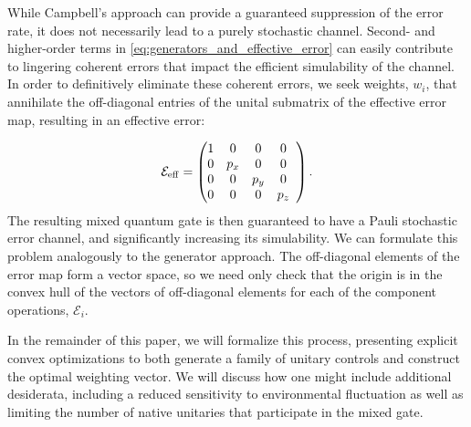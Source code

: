 \documentclass[aps,nofootinbib,pra,notitlepage,twocolumn]{revtex4-1}
\begin{document}
While Campbell's approach can provide a guaranteed suppression of the error rate, it does not necessarily lead to a purely stochastic channel. Second- and higher-order terms in \eqref{eq:generators_and_effective_error} can easily contribute to lingering coherent errors that impact the efficient simulability of the channel. In order to definitively eliminate these coherent errors, we seek weights, $w_i$, that annihilate the off-diagonal entries of the unital submatrix of the effective error map, resulting in an effective error:

\begin{equation}
	\mathcal{E}_{\rm{eff}} = 
	\left(\begin{array}{@{}ccccc@{}}
		1 & 0 & 0 & 0 \\ 
    	0 &  p_x & 0 & 0 \\
		0 & 0 &  p_y & 0\\
		0 & 0 & 0 &  p_z\\
	\end{array} 	
	\right).
\end{equation}
The resulting mixed quantum gate is then guaranteed to have a Pauli stochastic error channel, and significantly increasing its simulability. We can formulate this problem analogously to the generator approach. The off-diagonal elements of the error map form a vector space, so we need only check that the origin is in the convex hull of the vectors of off-diagonal elements for each of the component operations, $\mathcal{E}_i$. 

In the remainder of this paper, we will formalize this process, presenting explicit convex optimizations to both generate a family of unitary controls and construct the optimal weighting vector. We will discuss how one might include additional desiderata, including a reduced sensitivity to environmental fluctuation as well as limiting the number of native unitaries that participate in the mixed gate. 
\end{document}
